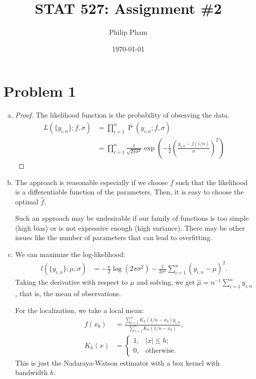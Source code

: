 \documentclass[letterpaper]{article}
\title{STAT 527: Assignment \#2}
\author{Philip Pham}
\date{\today}
\DeclareMathOperator{\Prob}{P}
\begin{document}
\maketitle

\section*{Problem 1}

\begin{enumerate}[(a)]
\item
  \begin{proof}
    The likelihood function is the probability of observing the data.
    \begin{align*}
      L\left(\{y_{i,n}\}; f,\sigma\right)
      &= \prod_{i=1}^n \Prob\left(y_{i,n}; f, \sigma\right) \\
      &= \prod_{i=1}^n \frac{1}{\sqrt{2\pi\sigma^2}}\exp\left(
        -\frac{1}{2}\left(\frac{y_{i,n} - f\left(i/n\right)}{\sigma}\right)^2\right)
    \end{align*}
  \end{proof}
\item The approach is reasonable especially if we choose $f$ such that the
  likelihood is a differentiable function of the parameters. Then, it is easy to
  choose the optimal $\hat{f}$.
  
  Such an approach may be undesirable if our family of functions is too simple
  (high bias) or is not expressive enough (high variance). There may be other
  issues like the number of parameters that can lead to overfitting.
\item We can maximize the log-likelihood:
  \begin{align*}
    l\left(\{y_{i,n}\}; \mu,\sigma\right)
    &= -\frac{n}{2}\log\left(2\pi\sigma^2\right)  - \frac{1}{2\sigma^2}\sum_{i=1}^n\left(y_{i,n} - \mu\right)^2.
  \end{align*}
  Taking the derivative with respect to $\mu$ and solving, we get
  $\hat{\mu} = n^{-1}\sum_{i=1}^n y_{i,n}$, that is, the mean of observations.

  For the localization, we take a local mean:
  \begin{align*}
    f(x_0)
    &=
      \frac{\sum_{i=1}^n K_h\left(1/n - x_0\right)y_{i,n}}{\sum_{i=1}^n K_h\left(1/n - x_0\right)}, \\
    K_h\left(x\right) &= \begin{cases}
      1, &|x| \leq h; \\
      0, &\text{otherwise.}
    \end{cases}
  \end{align*}
  This is just the Nadaraya-Watson estimator with a box kernel with bandwidth
  $h$.
\end{enumerate}
\end{document}
